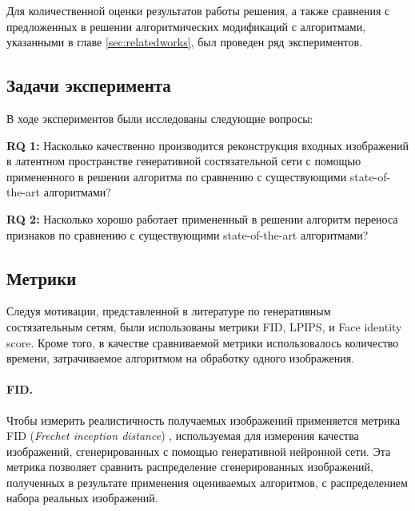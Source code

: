 
Для количественной оценки результатов работы решения, а также сравнения с предложенных в решении алгоритмических модификаций с алгоритмами, указанными в главе \ref{sec:relatedworks}, был проведен ряд экспериментов.


\subsection{Задачи эксперимента}
В ходе экспериментов были исследованы следующие вопросы:

\textbf{RQ 1: } Насколько качественно производится реконструкция входных изображений в латентном пространстве генеративной состязательной сети с помощью примененного в решении алгоритма по сравнению с существующими state-of-the-art алгоритмами?

\textbf{RQ 2: }Насколько хорошо работает примененный в решении алгоритм переноса признаков по сравнению с существующими state-of-the-art алгоритмами?



\subsection{Метрики}
Следуя мотивации, представленной в литературе по генеративным состязательным сетям, были использованы метрики FID, LPIPS, и Face identity score. Кроме того, в качестве сравниваемой метрики использовалось количество времени, затрачиваемое алгоритмом на обработку одного изображения.

\paragraph{FID.} 
Чтобы измерить реалистичность получаемых изображений применяется метрика FID (\emph{Frechet inception distance}) \cite{heusel2017fid}, используемая для измерения качества изображений, сгенерированных с помощью генеративной нейронной сети.
Эта метрика позволяет сравнить распределение сгенерированных изображений, полученных в результате применения оцениваемых алгоритмов, с распределением набора реальных изображений.


